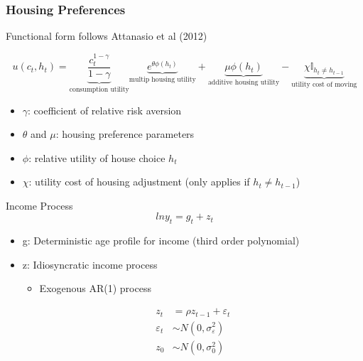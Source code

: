 \documentclass[10pt,english,t,10pt]{beamer}
\begin{document}
\begin{frame}
\frametitle{Housing Preferences}
Functional form follows Attanasio et al (2012)

\begin{equation}
u(c_t, h_t) =
\underbrace{ \frac{c_t ^ {1-\gamma}}{ 1-\gamma } }_\text{consumption utility}
\underbrace{ e^{ \theta \phi(h_t) } }_\text{multip housing utility}
+
\underbrace{ \mu \phi(h_t) }_\text{additive housing utility}
-
\underbrace{ \chi \mathbb{I}_{h_{t} \neq h_{t-1}}  }_\text{utility cost of moving}
\nonumber
\end{equation}



\begin{itemize}
\item {\footnotesize $\gamma$: coefficient of relative risk aversion}
\item {\footnotesize $\theta$ and $\mu$: housing preference parameters}
\item {\footnotesize $\phi$: relative utility of house choice $h_t$ }
\item {\footnotesize $\chi$: utility cost of housing adjustment (only applies if $h_{t} \neq h_{t-1}$)}

\end{itemize}

\end{frame}


\begin{frame} {Income Process}
\begin{equation}
ln y_t = g_t + z_t
\nonumber
\end{equation}
\begin{itemize}
	\item g: Deterministic age profile for income (third order polynomial)
	\medskip
	\item z: Idiosyncratic income process
	\medskip
	\begin{itemize}
		\item Exogenous AR(1) process
	\end{itemize}
	\begin{equation}
	\begin{split}
	z_t &= \rho z_{t-1} + \varepsilon_t \nonumber \\
	\varepsilon_t & \sim N(0, \sigma^2_\varepsilon) \\
	z_0 & \sim N(0, \sigma^2_{0}) \\
	\end{split}
	\end{equation}
\end{itemize}
\end{frame}
\end{document}
